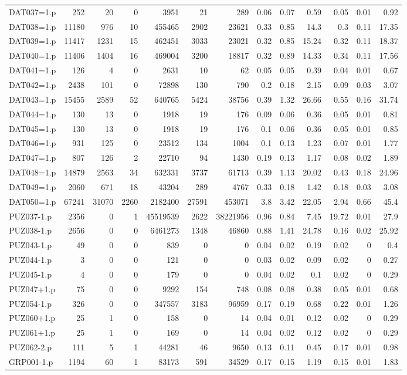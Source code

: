 \begin{table}[H]
\begin{adjustwidth}{-0.4in}{-0.5in}
\begin{tabular}{| l || r | r | r || r | r | r || r | r | r | r | r | r |}
DAT037=1.p&252&20&0&3951&21&289&0.06&0.07&0.59&0.05&0.01&0.92\\
DAT038=1.p&11180&976&10&455465&2902&23621&0.33&0.85&14.3&0.3&0.11&17.35\\
DAT039=1.p&11417&1231&15&462451&3033&23021&0.32&0.85&15.24&0.32&0.11&18.37\\
DAT040=1.p&11406&1404&16&469004&3200&18817&0.32&0.89&14.33&0.34&0.11&17.56\\
DAT041=1.p&126&4&0&2631&10&62&0.05&0.05&0.39&0.04&0.01&0.67\\
DAT042=1.p&2438&101&0&72898&130&790&0.2&0.18&2.15&0.09&0.03&3.07\\
DAT043=1.p&15455&2589&52&640765&5424&38756&0.39&1.32&26.66&0.55&0.16&31.74\\
DAT044=1.p&130&13&0&1918&19&176&0.09&0.06&0.36&0.05&0.01&0.81\\
DAT045=1.p&130&13&0&1918&19&176&0.1&0.06&0.36&0.05&0.01&0.85\\
DAT046=1.p&931&125&0&23512&134&1004&0.1&0.13&1.23&0.07&0.01&1.77\\
DAT047=1.p&807&126&2&22710&94&1430&0.19&0.13&1.17&0.08&0.02&1.89\\
DAT048=1.p&14879&2563&34&632331&3737&61713&0.39&1.13&20.02&0.43&0.18&24.96\\
DAT049=1.p&2060&671&18&43204&289&4767&0.33&0.18&1.42&0.18&0.03&3.08\\
DAT050=1.p&67241&31070&2260&2182400&27591&453071&3.8&3.42&22.05&2.94&0.66&45.4\\
PUZ037-1.p&2356&0&1&45519539&2622&38221956&0.96&0.84&7.45&19.72&0.01&27.9\\
PUZ038-1.p&2656&0&0&6461273&1348&46860&0.88&1.41&24.78&0.16&0.02&25.92\\
PUZ043-1.p&49&0&0&839&0&0&0.04&0.02&0.19&0.02&0&0.4\\
PUZ044-1.p&3&0&0&121&0&0&0.03&0.02&0.09&0.02&0&0.27\\
PUZ045-1.p&4&0&0&179&0&0&0.04&0.02&0.1&0.02&0&0.29\\
PUZ047+1.p&75&0&0&9292&154&748&0.08&0.08&0.38&0.05&0.01&0.68\\
PUZ054-1.p&326&0&0&347557&3183&96959&0.17&0.19&0.68&0.22&0.01&1.26\\
PUZ060+1.p&25&1&0&158&0&14&0.04&0.01&0.12&0.02&0&0.29\\
PUZ061+1.p&25&1&0&169&0&14&0.04&0.02&0.12&0.02&0&0.29\\
PUZ062-2.p&111&5&1&44281&46&9650&0.13&0.11&0.45&0.17&0.01&0.98\\
GRP001-1.p&1194&60&1&83173&591&34529&0.17&0.15&1.19&0.15&0.01&1.83\\

\end{tabular}
\end{adjustwidth}
\end{table}
